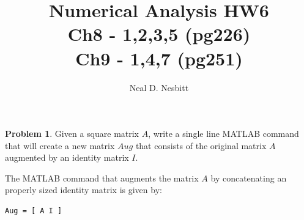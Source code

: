 \documentclass{article}
\title{Numerical Analysis HW6\\
Ch8 - 1,2,3,5 (pg226)\\
Ch9 - 1,4,7 (pg251)\\}
\author{Neal D. Nesbitt}
\begin{document}
\maketitle

\theoremstyle{definition}
\newtheorem{problem}{Problem}


\begin{problem}
Given a square matrix $A$, write a single line MATLAB command that will create a new matrix $Aug$ that consists of the original matrix $A$ augmented by an identity matrix $I$.
\end{problem}

The MATLAB command that augments the matrix $A$ by concatenating an properly sized identity matrix is given by:
\begin{lstlisting}
Aug = [ A I ]
\end{lstlisting}
\end{document}
